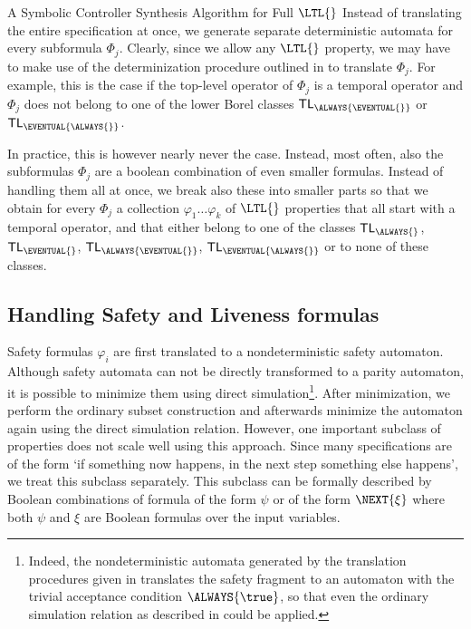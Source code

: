 \documentclass[copyright,creativecommons]{eptcs}
\begin{document}
\begin{section}{A Symbolic Controller Synthesis Algorithm for Full $\LTL{}$}
Instead of translating the entire specification at once, we generate separate deterministic automata for every subformula $\Phi_j$. Clearly, since we allow any $\LTL{}$ property, we may have to make use of the determinization procedure outlined in \cite{MoSc08} to translate $\Phi_j$. For example, this is the case if the top-level operator of $\Phi_j$ is a temporal operator and $\Phi_j$ does not belong to one of the lower Borel classes ${\sf TL_{\ALWAYS{\EVENTUAL{}}}}$ or ${\sf TL_{\EVENTUAL{\ALWAYS{}}}}$.

In practice, this is however nearly never the case. Instead, most often, also the subformulas $\Phi_j$ are a boolean combination of even smaller formulas. Instead of handling them all at once, we break also these into smaller parts so that we obtain for every $\Phi_j$ a collection $\varphi_1\dots \varphi_k$ of $\LTL{}$ properties that all start with a temporal operator, and that either belong to one of the classes ${\sf TL_{\ALWAYS{}}}$, ${\sf TL_{\EVENTUAL{}}}$, ${\sf TL_{\ALWAYS{\EVENTUAL{}}}}$, ${\sf TL_{\EVENTUAL{\ALWAYS{}}}}$ or to none of these classes.


\subsection{Handling Safety and Liveness formulas}

Safety formulas $\varphi_i$ are first translated to a nondeterministic safety automaton. Although safety automata can not be directly transformed to a parity automaton, it is possible to minimize them using direct simulation\footnote{Indeed, the nondeterministic automata generated by the translation procedures given in \cite{Schn03} translates the safety fragment to an automaton with the trivial acceptance condition $\ALWAYS{\true}$, so that even the ordinary simulation relation as described in \cite{EtWS05} could be applied.}. After minimization, we perform the ordinary subset construction and afterwards minimize the automaton again using the direct simulation relation. However, one important subclass of properties does not scale well using this approach. Since many specifications are of the form `if something now happens, in the next step something else happens', we treat this subclass separately. This subclass can be formally described by Boolean combinations of formula of the form $\psi$ or of the form $\NEXT{\xi}$ where both $\psi$ and $\xi$ are Boolean formulas over the input variables.


\end{section}
\end{document}
